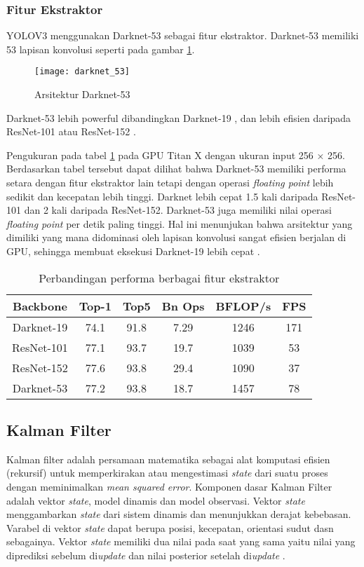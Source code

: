 \documentclass[../thesis.tex]{subfiles}
\begin{document}
\subsubsection{Fitur Ekstraktor}
YOLOV3 menggunakan Darknet-53 sebagai fitur ekstraktor. Darknet-53 memiliki 53 lapisan konvolusi seperti pada gambar \ref{darknet_53}.
\begin{figure}[htp]
	\centering
	\texttt{[image: darknet\_53]}
	\caption{Arsitektur Darknet-53}
	\label{darknet_53}
\end{figure}
Darknet-53 lebih powerful dibandingkan Darknet-19 \cite{YoloV2}, dan lebih efisien daripada ResNet-101 atau ResNet-152 \cite{YoloV3}.

Pengukuran pada tabel \ref{tabel_comp_FE} \cite{YoloV3} pada GPU Titan X dengan ukuran input 256 × 256. Berdasarkan tabel tersebut dapat dilihat bahwa Darknet-53 memiliki performa setara dengan fitur ekstraktor lain tetapi dengan operasi \textit{floating point} lebih sedikit dan kecepatan lebih tinggi. Darknet lebih cepat 1.5 kali daripada ResNet-101 dan 2 kali daripada ResNet-152.
Darknet-53 juga memiliki nilai operasi \textit{floating point} per detik paling tinggi. Hal ini menunjukan bahwa arsitektur yang dimiliki yang mana didominasi oleh lapisan konvolusi sangat efisien berjalan di GPU, sehingga membuat eksekusi Darknet-19 lebih cepat \cite{YoloV3}.

\begin{table}[htp]
\centering
\begin{tabular}{ cccccc } 
	Backbone & Top-1 & Top5 & Bn Ops & BFLOP/s & FPS\\
	\hline
	Darknet-19 \cite{YoloV2} & 74.1& 91.8& 7.29& 1246 & 171\\
	ResNet-101 \cite{ResNet} & 77.1& 93.7& 19.7& 1039 & 53 \\
	ResNet-152 \cite{ResNet} & 77.6& 93.8 &29.4& 1090 & 37 \\
	Darknet-53 \cite{YoloV3} &77.2& 93.8&18.7& 1457 & 78 \\
\end{tabular}
\caption{Perbandingan performa berbagai fitur ekstraktor}
\label{tabel_comp_FE}
\end{table}

\subsection{Kalman Filter}

Kalman filter adalah persamaan matematika sebagai alat komputasi efisien (rekursif) untuk memperkirakan atau mengestimasi \textit{state} dari suatu proses dengan meminimalkan \textit{mean squared error}.
Komponen dasar Kalman Filter adalah vektor \textit{state}, model dinamis dan model observasi.
Vektor \textit{state} menggambarkan \textit{state} dari sistem dinamis dan menunjukkan derajat kebebasan. Varabel di vektor \textit{state} dapat berupa posisi, kecepatan, orientasi sudut dasn sebagainya. Vektor \textit{state} memiliki dua nilai pada saat yang sama yaitu 
nilai yang diprediksi sebelum di\textit{update} dan nilai posterior setelah di\textit{update} \cite{Kalman}.
\end{document}
